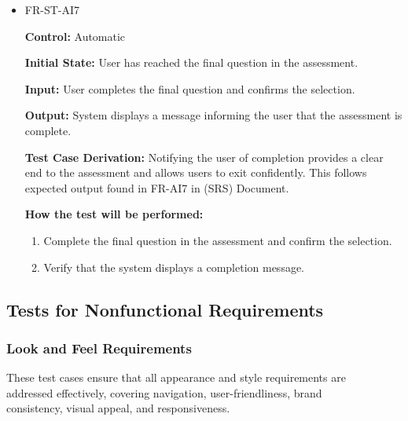 \documentclass[12pt, titlepage]{article}
\begin{document}
\begin{itemize}
  \item FR-ST-AI7
    \begin{mdframed}[linewidth=0.5mm]
      \textbf{Control:} Automatic \par
      \textbf{Initial State:} User has reached the final question in the assessment. \par
      \textbf{Input:} User completes the final question and confirms the selection. \par
      \textbf{Output:} System displays a message informing the user that the assessment is complete. \par
      \textbf{Test Case Derivation:} Notifying the user of completion provides a clear end to 
      the assessment and allows users to exit confidently. 
      This follows expected output found in FR-AI7 in (SRS) Document. \par
      \textbf{How the test will be performed:}
      \begin{enumerate}[noitemsep]
        \item Complete the final question in the assessment and confirm the selection.
        \item Verify that the system displays a completion message.
      \end{enumerate}
    \end{mdframed}
\end{itemize}

\pagebreak

\subsection{Tests for Nonfunctional Requirements}

\subsubsection{Look and Feel Requirements}

These test cases ensure that all appearance and style requirements are\\
addressed effectively, covering navigation, user-friendliness, brand \\
consistency, visual appeal, and responsiveness.
\end{document}
